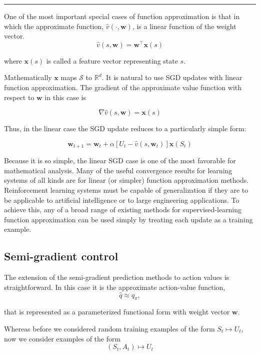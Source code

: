 \documentclass[11pt]{article}
\theoremstyle{plain} %
\theoremstyle{remark}
\begin{document}
\vspace*{0.65em}
\hrule


One of the most important special cases of function approximation is
  that in which the approximate function, $\hat{v}(\cdot, \boldsymbol{w})$, is a
  linear function of the weight vector. 
$$
\hat{v}(s, \boldsymbol{w})=\boldsymbol{w}^{\top} \boldsymbol{x}(s)
$$

where $\boldsymbol{x}(s)$ is called a feature vector representing state $s$.

 Mathematically $\boldsymbol{x}$ maps $\mathcal{S}$ to $\mathbb{R}^{d}$. It is natural to use SGD updates with linear function approximation. The gradient of the approximate value function with respect to
  $\boldsymbol{w}$ in this case is

$$
\nabla \hat{v}(s, \boldsymbol{w})=\boldsymbol{x}(s)
$$

 Thus, in the linear case the SGD update reduces to a particularly simple
  form:

$$
\boldsymbol{w}_{t+1}=\boldsymbol{w}_{t}+\alpha\left[U_{t}-\hat{v}\left(s, \boldsymbol{w}_{t}\right)\right] \boldsymbol{x}\left(S_{t}\right)
$$

Because it is so simple, the linear SGD case is one of the most
  favorable for mathematical analysis. Many of the useful convergence results for learning systems of all kinds
  are for linear (or simpler) function approximation methods. Reinforcement learning systems must be capable of generalization if they
  are to be applicable to artificial intelligence or to large engineering
  applications. To achieve this, any of a broad range of existing methods for
  supervised-learning function approximation can be used simply by treating each
  update as a training example.

\subsection{Semi-gradient control}
 The extension of the semi-gradient prediction methods to action values
  is straightforward. In this case it is the approximate action-value function,
$$
\hat{q} \approx q_{\pi},
$$

that is represented as a parameterized functional form with weight vector
$\boldsymbol{w}$.

 Whereas before we considered random training examples of the form $S_{t}
  \mapsto U_{t}$, now we consider examples of the form 
$$
\left(S_{t}, A_{t}\right) \mapsto U_{t}
$$
\end{document}
